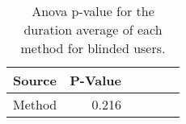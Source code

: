
\begin{table}[!htb]
\centering
\caption{Anova p-value for the duration average of each method for blinded users.}
\label{tab:blockedanova_duration_avg}
\begin{tabular}{lrrrrr}
\toprule
Source & P-Value \\
\midrule
Method &   0.216 \\
\bottomrule
\end{tabular}
\end{table}


